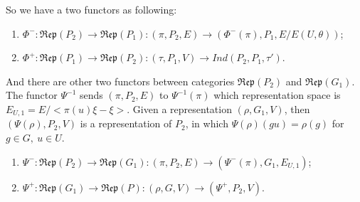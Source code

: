 \documentclass[12pt,a4paper,english]{article}
\theoremstyle{plain}
\theoremstyle{definition}
\begin{document}
So we have a two functors as following:
\begin{enumerate}
    \item $\Phi^{-}:\mathfrak{Rep}(P_{2})\rightarrow \mathfrak{Rep}(P_{1}): (\pi,P_{2},E)\rightarrow (\Phi^{-}(\pi),P_{1}, E/E(U,\theta))$;
    \item $\Phi^{+}:\mathfrak{Rep}(P_{1})\rightarrow \mathfrak{Rep}(P_{2}):(\tau, P_{1}, V)\rightarrow Ind(P_{2},P_{1},\tau')$.
\end{enumerate}
And there are other two functors between categories $\mathfrak{Rep}(P_{2})$ and $\mathfrak{Rep}(G_{1})$. The functor $\Psi^{-1}$ sends $(\pi, P_{2},E)$ to $\Psi^{-1}(\pi)$ which representation space is $E_{U,1}=E/<\pi(u)\xi-\xi>$. Given a representation $(\rho,G_{1},V)$, then $(\Psi(\rho),P_{2},V)$ is a representation of $P_{2}$, in which $\Psi(\rho)(gu)=\rho(g)$ for $g\in G,\ u\in U$.
\begin{enumerate}
    \item $\Psi^{-}:\mathfrak{Rep}(P_{2})\rightarrow \mathfrak{Rep}(G_{1}):(\pi, P_{2}, E)\rightarrow (\Psi^{-}(\pi),G_{1},E_{U,1})$;
    \item $\Psi^{+}:\mathfrak{Rep}(G_{1})\rightarrow \mathfrak{Rep}(P):(\rho, G, V)\rightarrow (\Psi^{+}, P_{2}, V)$.
\end{enumerate}
\end{document}
